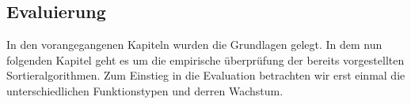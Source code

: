 \documentclass{article}
\begin{document}



\newpage
\subsection{Evaluierung}
In den vorangegangenen Kapiteln wurden die Grundlagen gelegt. In dem nun folgenden Kapitel geht es um die empirische überprüfung der bereits vorgestellten Sortieralgorithmen.
Zum Einstieg in die Evaluation betrachten wir erst einmal die unterschiedlichen Funktionstypen und derren Wachstum.
\end{document}
